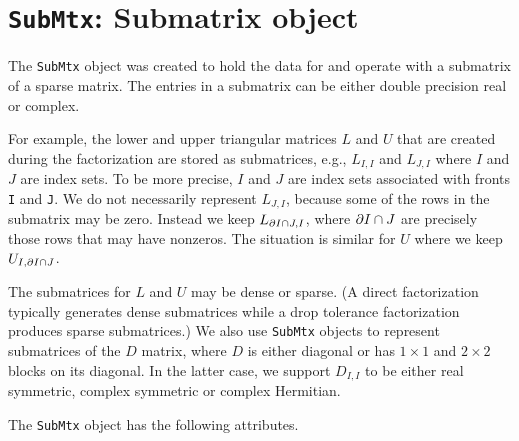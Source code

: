 \par
\chapter{{\tt SubMtx}: Submatrix object}
\par
The {\tt SubMtx} object was created to hold the data for and operate
with a submatrix of a sparse matrix.
The entries in a submatrix can be either double precision 
real or complex.
\par
For example, the lower and upper triangular matrices $L$ and $U$
that are created during the factorization are stored as
submatrices,
e.g., $L_{I,I}$ and $L_{J,I}$ where $I$ and $J$ are index sets.
To be more precise, $I$ and $J$ are index sets associated with
fronts {\tt I} and {\tt J}.
We do not necessarily represent $L_{J,I}$, 
because some of the rows in the submatrix may be zero.
Instead we keep $L_{{\partial}{I}\cap J,I}$, where
${\partial}{I} \cap J$ are precisely those rows that may have nonzeros.
The situation is similar for $U$ where we keep $U_{I,{\partial}{I}\cap J}$.
\par
The submatrices for $L$ and $U$ may be dense or sparse.
(A direct factorization typically generates dense submatrices
while a drop tolerance factorization produces sparse submatrices.)
We also use {\tt SubMtx} objects to represent submatrices of the
$D$ matrix, where $D$ is either diagonal or has $1 \times 1$ and
$2 \times 2$ blocks on its diagonal.
In the latter case, we support $D_{I,I}$ to be either 
real symmetric, complex symmetric or complex Hermitian.
\par
The {\tt SubMtx} object has the following attributes.
